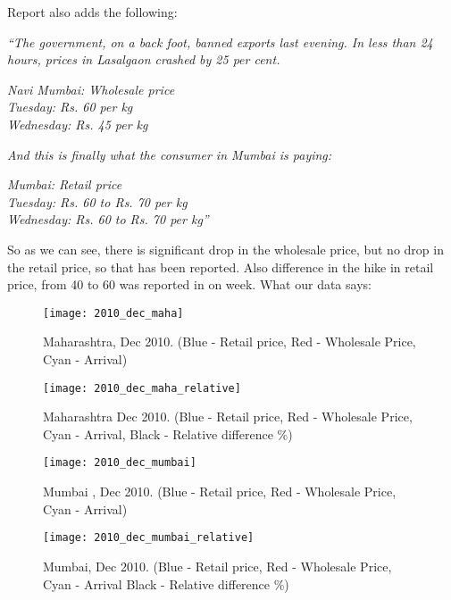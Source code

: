 Report also adds the following:

\textit{“The government, on a back foot, banned exports last evening. In less than 24 hours, prices in Lasalgaon crashed by 25 per cent.}\\
\begin{center}
\textit{Navi Mumbai: Wholesale price } \\
\textit{Tuesday: Rs. 60 per kg }\\
\textit{Wednesday: Rs. 45 per kg }
\end{center}
\textit{And this is finally what the consumer in Mumbai is paying:}
\begin{center}
\textit{Mumbai: Retail price}\\
\textit{Tuesday: Rs. 60 to Rs. 70 per kg}\\
\textit{Wednesday: Rs. 60 to Rs. 70 per kg” }
\end{center}
So as we can see, there is significant drop in the wholesale price, but no drop in the retail price, so that has been reported. Also difference in the hike in retail price, from 40 to 60 was reported in on week. What our data says:

\begin{figure}[h]
\begin{center}    
\texttt{[image: 2010\_dec\_maha]}
\caption{Maharashtra, Dec 2010. (Blue - Retail price, Red - Wholesale Price, Cyan - Arrival)}
\label{fig:MaharashtraDec2010}
\end{center}
\end{figure}

\begin{figure}[h]
\begin{center}    
\texttt{[image: 2010\_dec\_maha\_relative]}
\caption{Maharashtra Dec 2010. (Blue - Retail price, Red - Wholesale Price, Cyan - Arrival, Black - Relative difference \%)}
\label{fig:MaharashtraDec2010Relativedifference}
\end{center}
\end{figure}

\begin{figure}[h]
\begin{center}    
\texttt{[image: 2010\_dec\_mumbai]}
\caption{Mumbai , Dec 2010. (Blue - Retail price, Red - Wholesale Price, Cyan - Arrival)}
\label{fig:MumbaiDec2010}
\end{center}
\end{figure}

\begin{figure}[h]
\begin{center}    
\texttt{[image: 2010\_dec\_mumbai\_relative]}
\caption{Mumbai, Dec 2010. (Blue - Retail price, Red - Wholesale Price, Cyan - Arrival Black - Relative difference \%)}
\label{fig:MumbaiDec2010Relativedifference}
\end{center}
\end{figure}

